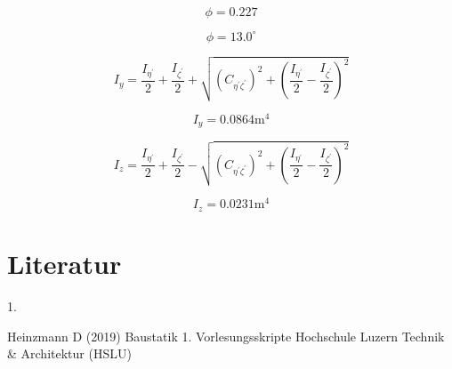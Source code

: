 \documentclass[
  12pt,
  letterpaper,
  DIV=11,
  egregdoesnotlikesansseriftitles]{scrartcl}
\newlength{\cslhangindent}
\newlength{\csllabelwidth}
\newlength{\cslentryspacingunit} %
\newenvironment{CSLReferences}[2] %
 {%
  \setlength{\parindent}{0pt}
  \ifodd #1
  \let\oldpar\par
  \def\par{\hangindent=\cslhangindent\oldpar}
  \fi
  \setlength{\parskip}{#2\cslentryspacingunit}
 }%
 {}
\newcommand{\CSLLeftMargin}[1]{\parbox[t]{\csllabelwidth}{#1}}
\newcommand{\CSLRightInline}[1]{\parbox[t]{\linewidth - \csllabelwidth}{#1}\break}
\begin{document}
\begin{equation}\phi = 0.227\end{equation}

\begin{equation}\phi = 13.0 ^\circ\end{equation}

\begin{equation}I_{y} = \frac{I_{\eta^{'}}}{2} + \frac{I_{\zeta^{'}}}{2} + \sqrt{\left(C_{\eta^{'}\zeta^{'}}\right)^{2} + \left(\frac{I_{\eta^{'}}}{2} - \frac{I_{\zeta^{'}}}{2}\right)^{2}}\end{equation}

\begin{equation}I_{y} = 0.0864 \text{m}^{4}\end{equation}

\begin{equation}I_{z} = \frac{I_{\eta^{'}}}{2} + \frac{I_{\zeta^{'}}}{2} - \sqrt{\left(C_{\eta^{'}\zeta^{'}}\right)^{2} + \left(\frac{I_{\eta^{'}}}{2} - \frac{I_{\zeta^{'}}}{2}\right)^{2}}\end{equation}

\begin{equation}I_{z} = 0.0231 \text{m}^{4}\end{equation}

\newpage{}

\hypertarget{literatur}{%
\section*{Literatur}\label{literatur}}

\hypertarget{refs}{}
\begin{CSLReferences}{0}{0}
\leavevmode{}%
\CSLLeftMargin{1. }%
\CSLRightInline{Heinzmann D (2019) Baustatik 1. Vorlesungsskripte
Hochschule Luzern Technik \& Architektur (HSLU)}

\end{CSLReferences}
\end{document}
